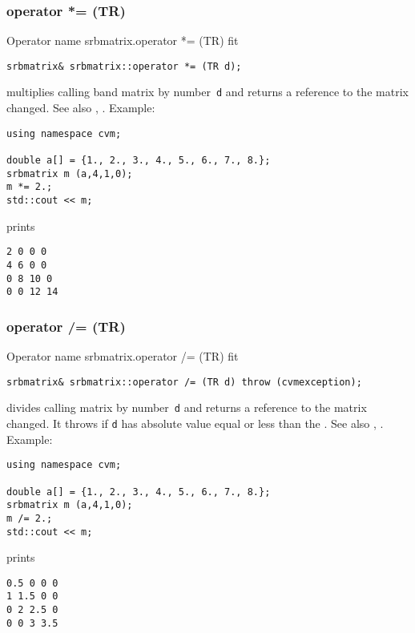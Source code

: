 \subsubsection{operator *= (TR)}
Operator%
\pdfdest name {srbmatrix.operator *= (TR)} fit
\begin{verbatim}
srbmatrix& srbmatrix::operator *= (TR d);
\end{verbatim}
multiplies  calling band matrix by  number~\verb"d"
and returns a reference to
the matrix changed.
See also ,
.
Example:
\begin{Verbatim}
using namespace cvm;

double a[] = {1., 2., 3., 4., 5., 6., 7., 8.};
srbmatrix m (a,4,1,0);
m *= 2.;
std::cout << m;
\end{Verbatim}
prints
\begin{Verbatim}
2 0 0 0
4 6 0 0
0 8 10 0
0 0 12 14
\end{Verbatim}
\newpage



\subsubsection{operator /= (TR)}
Operator%
\pdfdest name {srbmatrix.operator /= (TR)} fit
\begin{verbatim}
srbmatrix& srbmatrix::operator /= (TR d) throw (cvmexception);
\end{verbatim}
divides  calling matrix by  number~\verb"d"
and returns a reference to
the matrix changed.
It throws  
if \verb"d" has  absolute value equal or less
than the 
.
See also ,
.
Example:
\begin{Verbatim}
using namespace cvm;

double a[] = {1., 2., 3., 4., 5., 6., 7., 8.};
srbmatrix m (a,4,1,0);
m /= 2.;
std::cout << m;
\end{Verbatim}
prints
\begin{Verbatim}
0.5 0 0 0
1 1.5 0 0
0 2 2.5 0
0 0 3 3.5
\end{Verbatim}
\newpage




